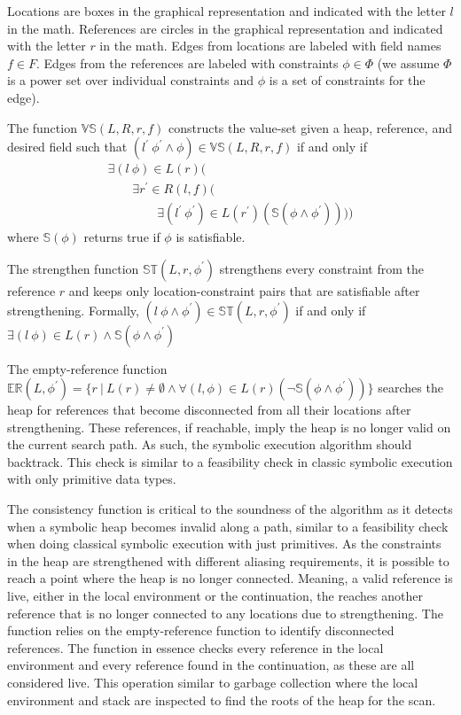 Locations are boxes in the graphical representation and indicated with
the letter $l$ in the math. References are circles in the graphical
representation and indicated with the letter $r$ in the math. Edges
from locations are labeled with field names $f \in F$. Edges from the
references are labeled with constraints $\phi \in \Phi$ (we assume
$\Phi$ is a power set over individual constraints and $\phi$ is a set
of constraints for the edge).

The function $\mathbb{VS}(L,R,r,f)$ constructs the value-set given a
heap, reference, and desired field such that
$(l^\prime\ \phi^\prime\wedge\phi) \in \mathbb{VS}(L,R,r,f)$ if and
only if
\[
\begin{array}{l}
  \exists (l\ \phi) \in L(r) ( \\
  \ \ \ \ \ \ \ \ \ \exists r^\prime \in R(l,f) ( \\
  \ \ \ \ \ \ \ \ \ \ \ \ \ \ \ \ \ \ \exists (l^\prime\ \phi^\prime) \in L(r^\prime) (\mathbb{S}(\phi\wedge\phi^\prime))))
\end{array}
\]
where $\mathbb{S}(\phi)$ returns true if $\phi$ is satisfiable.

The strengthen function $\mathbb{ST}(L,r,\phi^\prime)$ strengthens every
constraint from the reference $r$ and keeps only location-constraint
pairs that are satisfiable after strengthening. Formally,
$(l\ \phi\wedge\phi^\prime)\in\mathbb{ST}(L,r,\phi^\prime)$ if and
only if $\exists (l\ \phi)\in
L(r)\wedge\mathbb{S}(\phi\wedge\phi^\prime)$

The empty-reference function $\mathbb{ER}(L,\phi^\prime) = \{r\ |\ L(r) \neq
\emptyset \wedge \forall(l,\phi) \in L(r)(\neg \mathbb{S}(\phi \wedge
\phi^\prime))\}$ searches the heap for references that become
disconnected from all their locations after strengthening. These
references, if reachable, imply the heap is no longer valid on the
current search path. As such, the symbolic execution algorithm should
backtrack. This check is similar to a feasibility check in classic
symbolic execution with only primitive data types.

The consistency function is critical to the soundness of the algorithm
as it detects when a symbolic heap becomes invalid along a path,
similar to a feasibility check when doing classical symbolic execution
with just primitives. As the constraints in the heap are strengthened
with different aliasing requirements, it is possible to reach a point
where the heap is no longer connected. Meaning, a valid reference is
live, either in the local environment or the continuation, the reaches
another reference that is no longer connected to any locations due to
strengthening. The function relies on the empty-reference function to
identify disconnected references. The function in essence checks every
reference in the local environment and every reference found in the
continuation, as these are all considered live. This operation similar
to garbage collection where the local environment and stack are
inspected to find the roots of the heap for the scan.


